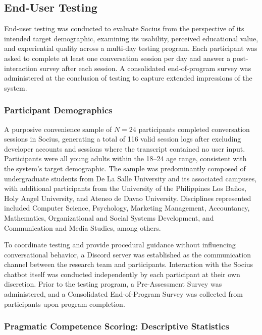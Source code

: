 \subsection{End-User Testing}
 
End-user testing was conducted to evaluate Socius from the perspective of its intended target demographic,
 examining its usability, perceived educational value, and experiential quality across a multi-day testing 
 program. Each participant was asked to complete at least one conversation session per day and answer a 
 post-interaction survey after each session. A consolidated end-of-program survey was administered at the 
 conclusion of testing to capture extended impressions of the system.
 
\subsubsection{Participant Demographics}
 
A purposive convenience sample of $N = 24$ participants completed conversation sessions in Socius,
 generating a total of 116 valid session logs after excluding developer accounts and sessions where 
 the transcript contained no user input. Participants were all young adults within the 18--24 age 
 range, consistent with the system's target demographic. The sample was predominantly composed of 
 undergraduate students from De La Salle University and its associated campuses, with additional 
 participants from the University of the Philippines Los Ba\~{n}os, Holy Angel University, and Ateneo 
 de Davao University. Disciplines represented included Computer Science, Psychology, Marketing 
 Management, Accountancy, Mathematics, Organizational and Social Systems Development, and Communication 
 and Media Studies, among others.
 
To coordinate testing and provide procedural guidance without influencing conversational behavior,
 a Discord server was established as the communication channel between the research team and participants. 
 Interaction with the Socius chatbot itself was conducted independently by each participant at their own 
 discretion. Prior to the testing program, a Pre-Assessment Survey was administered, and a Consolidated 
 End-of-Program Survey was collected from participants upon program completion.
 
\subsubsection{Pragmatic Competence Scoring: Descriptive Statistics}

